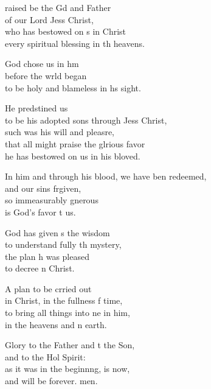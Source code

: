 \settowidth{\versewidth}{In him and through his blood, we have been redeemed, *}
\begin{psalmverse}%
  \begin{patverse}
raised be the Gd and Father\Med\\
of our Lord Jess Christ,\\
who has bestowed on s in Christ\Med\\
every spiritual blessing in th heavens.

God chose us in h\pointup{\i}m\Flex\\
before the wrld began\Med\\
to be holy and blameless in h\pointup{\i}s sight.

He predstined us\Med\\
to be his adopted sons through Jess Christ,\Med\\
such was his will and pleasre,\Flex\\
that all might praise the glrious favor\Med\\
he has bestowed on us in his bloved.

In him and through his blood, we have ben redeemed,\Med\\
and our sins frgiven,\\
so immeasurably gnerous\Med\\
is God’s favor t us.

God has given s the wisdom\Med\\
to understand fully th mystery,\\
the plan h was pleased\Med\\
to decree \pointup{\i}n Christ.

A plan to be crried out\Med\\
in Christ, in the fullness f time,\\
to bring all things into ne in him,\Med\\
in the heavens and n earth.

Glory to the Father and t the Son,\Med\\
and to the Hol Spirit:\\
as it was in the beginn\pointup{\i}ng, is now,\Med\\
and will be forever. men.
  \end{patverse}
\end{psalmverse}
